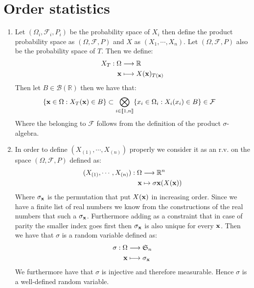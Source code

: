 \documentclass[10pt,a4paper]{article}
\begin{document}
\section{Order statistics}

\begin{enumerate}

\item Let $(\Omega_i, \mathcal{F}_i, P_i)$ be the probability space of $X_i$ then define the product probability space as $(\Omega, \mathcal{F}, P)$ and $X$ as $(X_1, \cdots, X_n)$. Let $(\Omega, \mathcal{F}, P)$ also be the probability space of $T$. Then we define:
\begin{align*}
X_T : \Omega &\longrightarrow \mathbb{R}\\
\vb{x} &\longmapsto X(\vb{x})_{T(\vb{x})}
\end{align*}
Then let $B \in \mathcal{B}(\mathbb{R})$ then we have that:
\begin{align*}
\{\vb{x} \in \Omega : X_T(\vb{x}) \in B\} &\subset \bigotimes_{i \in \llbracket 1, n \rrbracket} \{x_i \in \Omega_i :  X_i(x_i) \in B\} \in \mathcal{F}
\end{align*}
Where the belonging to $\mathcal{F}$ follows from the definition of the product $\sigma$-algebra. 

\item In order to define $(X_{(1)}, \cdots, X_{(n)})$ properly we consider it as an r.v. on the space $(\Omega, \mathcal{F}, P)$ defined as:
\begin{align*}
(X_{(1)}, \cdots, X_{(n)}) : \Omega &\longrightarrow \mathbb{R}^n\\
\vb{x} &\mapsto \sigma{\vb{x}}(X(\vb{x}))
\end{align*}
Where $\sigma_{\vb{x}}$ is the permutation that put $X(\vb{x})$ in increasing order. Since we have a finite list of real numbers we know from the constructions of the real numbers that such a $\sigma_{\vb{x}}$. Furthermore adding as a constraint that in case of parity the smaller index goes first then $\sigma_{\vb{x}}$ is also unique for every $\vb{x}$. Then we have that $\sigma$ is a random variable defined as:
\begin{align*}
\sigma : \Omega &\longrightarrow \mathfrak{S}_n\\
\vb{x} &\longmapsto \sigma_{\vb{x}}
\end{align*}
We furthermore have that $\sigma$ is injective and therefore measurable. Hence $\sigma$ is a well-defined random variable. 


\end{enumerate}
\end{document}
